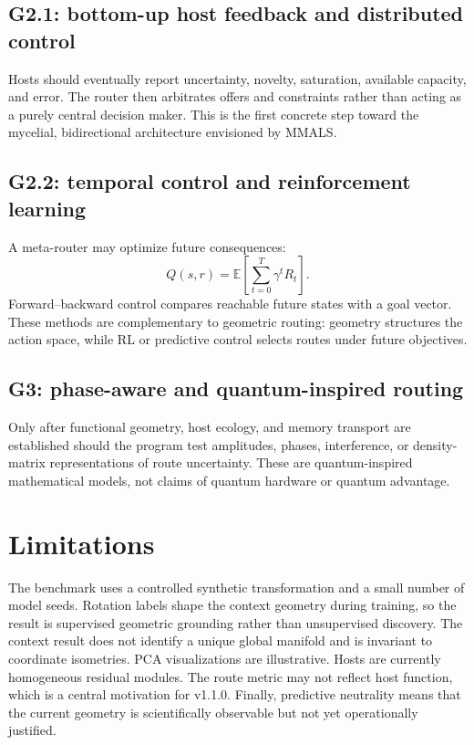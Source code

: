\documentclass[11pt,a4paper]{article}
\newcommand{\E}{\mathbb{E}}
\begin{document}
\subsection{G2.1: bottom-up host feedback and distributed control}

Hosts should eventually report uncertainty, novelty, saturation, available capacity, and error. The router then arbitrates offers and constraints rather than acting as a purely central decision maker. This is the first concrete step toward the mycelial, bidirectional architecture envisioned by MMALS.

\subsection{G2.2: temporal control and reinforcement learning}

A meta-router may optimize future consequences:
\begin{equation}
 Q(s,r)=\E\left[\sum_{t=0}^{T}\gamma^t R_t\right].
\end{equation}
Forward--backward control compares reachable future states with a goal vector. These methods are complementary to geometric routing: geometry structures the action space, while RL or predictive control selects routes under future objectives.

\subsection{G3: phase-aware and quantum-inspired routing}

Only after functional geometry, host ecology, and memory transport are established should the program test amplitudes, phases, interference, or density-matrix representations of route uncertainty. These are quantum-inspired mathematical models, not claims of quantum hardware or quantum advantage.

\section{Limitations}

The benchmark uses a controlled synthetic transformation and a small number of model seeds. Rotation labels shape the context geometry during training, so the result is supervised geometric grounding rather than unsupervised discovery. The context result does not identify a unique global manifold and is invariant to coordinate isometries. PCA visualizations are illustrative. Hosts are currently homogeneous residual modules. The route metric may not reflect host function, which is a central motivation for v1.1.0. Finally, predictive neutrality means that the current geometry is scientifically observable but not yet operationally justified.
\end{document}
